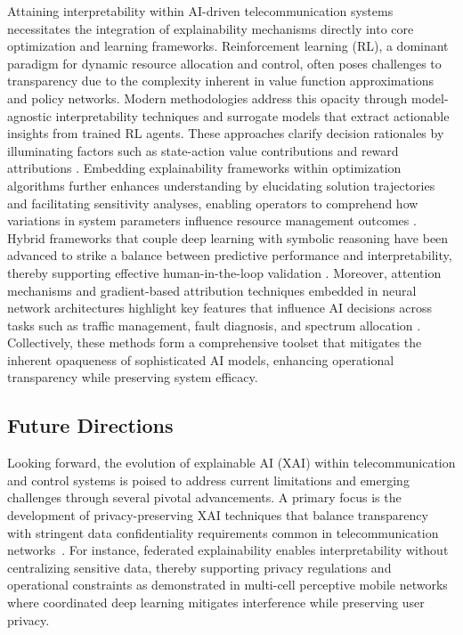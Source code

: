 \documentclass[sigconf]{acmart}
\begin{document}
Attaining interpretability within AI-driven telecommunication systems necessitates the integration of explainability mechanisms directly into core optimization and learning frameworks. Reinforcement learning (RL), a dominant paradigm for dynamic resource allocation and control, often poses challenges to transparency due to the complexity inherent in value function approximations and policy networks. Modern methodologies address this opacity through model-agnostic interpretability techniques and surrogate models that extract actionable insights from trained RL agents. These approaches clarify decision rationales by illuminating factors such as state-action value contributions and reward attributions \cite{ref3,ref5}. Embedding explainability frameworks within optimization algorithms further enhances understanding by elucidating solution trajectories and facilitating sensitivity analyses, enabling operators to comprehend how variations in system parameters influence resource management outcomes \cite{ref8,ref9}. Hybrid frameworks that couple deep learning with symbolic reasoning have been advanced to strike a balance between predictive performance and interpretability, thereby supporting effective human-in-the-loop validation \cite{ref12}. Moreover, attention mechanisms and gradient-based attribution techniques embedded in neural network architectures highlight key features that influence AI decisions across tasks such as traffic management, fault diagnosis, and spectrum allocation \cite{ref14}. Collectively, these methods form a comprehensive toolset that mitigates the inherent opaqueness of sophisticated AI models, enhancing operational transparency while preserving system efficacy.

\subsection{Future Directions}

Looking forward, the evolution of explainable AI (XAI) within telecommunication and control systems is poised to address current limitations and emerging challenges through several pivotal advancements. A primary focus is the development of privacy-preserving XAI techniques that balance transparency with stringent data confidentiality requirements common in telecommunication networks~\cite{ref48}. For instance, federated explainability enables interpretability without centralizing sensitive data, thereby supporting privacy regulations and operational constraints as demonstrated in multi-cell perceptive mobile networks where coordinated deep learning mitigates interference while preserving user privacy.
\end{document}
